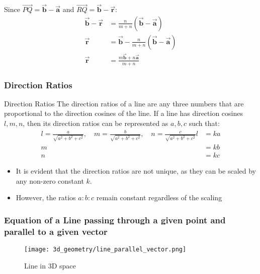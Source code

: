 \begin{frame}
 
    Since \(\vec{PQ} = \vec{\mathbf{b}} - \vec{\mathbf{a}}\) and \(\vec{RQ} = \vec{\mathbf{b}} - \vec{\mathbf{r}}\):
    \begin{align}
        \vec{\mathbf{b}} - \vec{\mathbf{r}} &= \frac{n}{m+n}(\vec{\mathbf{b}} - \vec{\mathbf{a}}) \\
        \vec{\mathbf{r}} &= \vec{\mathbf{b}} - \frac{n}{m+n}(\vec{\mathbf{b}} - \vec{\mathbf{a}}) \\
        \vec{\mathbf{r}} &= \frac{m\vec{\mathbf{b}} + n\vec{\mathbf{a}}}{m+n}
    \end{align}
  
\end{frame}

\begin{frame}
\frametitle{Direction Ratios}
\begin{block}{Direction Ratios}
    The direction ratios of a line are any three numbers that are proportional to the direction cosines of the line. If a line has direction cosines \(l, m, n\), then its direction ratios can be represented as \(a, b, c\) such that:
    \begin{align*}
        l = \frac{a}{\sqrt{a^2 + b^2 + c^2}}, \quad m = \frac{b}{\sqrt{a^2 + b^2 + c^2}}, \quad n = \frac{c}{\sqrt{a^2 + b^2 + c^2}} 
        l &= k a \\
        m &= k b \\
        n &= k c
    \end{align*}
\end{block} 
\begin{itemize}
    \item It is evident that the direction ratios are not unique, as they can be scaled by any non-zero constant \(k\).
    \item However, the ratios \(a:b:c\) remain constant regardless of the scaling
\end{itemize}
\end{frame}

\begin{frame}
    \frametitle{Equation of a Line passing through a given point and parallel to a given vector}
    \begin{figure}
        \texttt{[image: 3d\_geometry/line\_parallel\_vector.png]}
        \caption{Line in 3D space}
    \end{figure}
\end{frame}


